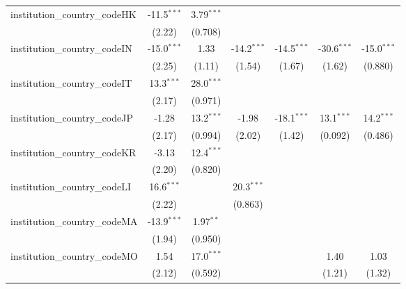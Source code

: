 \begin{tabular}{lcccccc}
   institution\_country\_codeHK          & -11.5$^{***}$ & 3.79$^{***}$  &               &               &               &   \\   
                                         & (2.22)        & (0.708)       &               &               &               &   \\   
   institution\_country\_codeIN          & -15.0$^{***}$ & 1.33          & -14.2$^{***}$ & -14.5$^{***}$ & -30.6$^{***}$ & -15.0$^{***}$\\   
                                         & (2.25)        & (1.11)        & (1.54)        & (1.67)        & (1.62)        & (0.880)\\   
   institution\_country\_codeIT          & 13.3$^{***}$  & 28.0$^{***}$  &               &               &               &   \\   
                                         & (2.17)        & (0.971)       &               &               &               &   \\   
   institution\_country\_codeJP          & -1.28         & 13.2$^{***}$  & -1.98         & -18.1$^{***}$ & 13.1$^{***}$  & 14.2$^{***}$\\   
                                         & (2.17)        & (0.994)       & (2.02)        & (1.42)        & (0.092)       & (0.486)\\   
   institution\_country\_codeKR          & -3.13         & 12.4$^{***}$  &               &               &               &   \\   
                                         & (2.20)        & (0.820)       &               &               &               &   \\   
   institution\_country\_codeLI          & 16.6$^{***}$  &               & 20.3$^{***}$  &               &               &   \\   
                                         & (2.22)        &               & (0.863)       &               &               &   \\   
   institution\_country\_codeMA          & -13.9$^{***}$ & 1.97$^{**}$   &               &               &               &   \\   
                                         & (1.94)        & (0.950)       &               &               &               &   \\   
   institution\_country\_codeMO          & 1.54          & 17.0$^{***}$  &               &               & 1.40          & 1.03\\   
                                         & (2.12)        & (0.592)       &               &               & (1.21)        & (1.32)\\   

\end{tabular}
